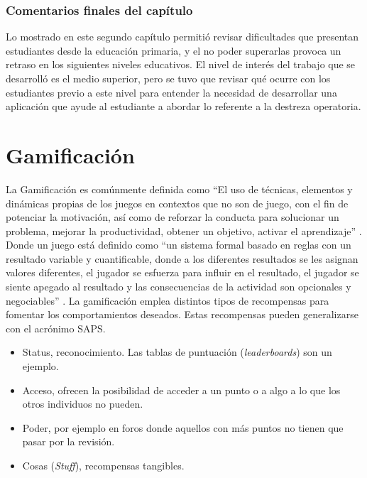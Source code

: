 \documentclass{article}
\begin{document}
\subsubsection{Comentarios finales del capítulo} 

Lo mostrado en este segundo capítulo permitió revisar dificultades que presentan estudiantes desde la educación primaria, y el no poder superarlas provoca un retraso  en los siguientes niveles educativos. El nivel de interés del trabajo que se desarrolló es el medio superior, pero se tuvo que revisar qué ocurre con los estudiantes previo a este nivel para entender la necesidad de desarrollar una aplicación que ayude al estudiante a abordar lo referente a la destreza operatoria.

\pagebreak
\section{Gamificación}
La Gamificación es comúnmente definida como “El uso de técnicas, elementos y dinámicas propias de los juegos en contextos que no son de juego, con el fin de potenciar la motivación, así como de reforzar la conducta para solucionar un problema, mejorar la productividad, obtener un objetivo, activar el aprendizaje” \cite{robson2015all}. Donde un juego está definido como “un sistema formal basado en reglas con un resultado variable y cuantificable, donde a los diferentes resultados se les asignan valores diferentes, el jugador se esfuerza para influir en el resultado, el jugador se siente apegado al resultado y las consecuencias de la actividad son opcionales y negociables” \cite{zichermann2011gamification}.
La gamificación emplea distintos tipos de recompensas para fomentar los comportamientos deseados. Estas recompensas pueden generalizarse con el acrónimo SAPS.
\begin{itemize}
	\item Status, reconocimiento. Las tablas de puntuación (\emph{leaderboards}) son un ejemplo.
	\item Acceso, ofrecen la posibilidad de acceder a un punto o a algo a lo que los otros individuos no pueden.
	\item Poder, por ejemplo en foros donde aquellos con más puntos no tienen que pasar por la revisión.
	\item Cosas (\emph{Stuff}), recompensas tangibles. 
\end{itemize}
\end{document}
